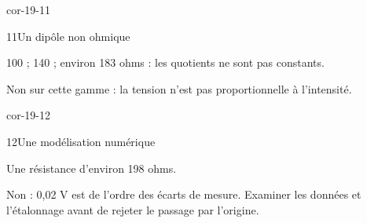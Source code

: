 \begin{blocLivre}{cor-19-11}\begin{corrige}{11}{Un dipôle non ohmique}
\begin{questions}
\item 100 ; 140 ; environ 183 ohms : les quotients ne sont pas constants.
\item Non sur cette gamme : la tension n’est pas proportionnelle à l’intensité.
\end{questions}
\end{corrige}\end{blocLivre}
\begin{blocLivre}{cor-19-12}\begin{corrige}{12}{Une modélisation numérique}
\begin{questions}
\item Une résistance d’environ 198 ohms.
\item Non : 0,02 V est de l’ordre des écarts de mesure. Examiner les données et l’étalonnage avant de rejeter le passage par l’origine.
\end{questions}
\end{corrige}\end{blocLivre}

